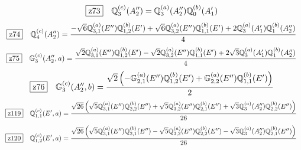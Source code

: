 \documentclass[fleqn,10pt,landscape]{jsarticle}
\begin{document}
\begin{dmath*}
\hspace*{3mm}\fbox{z73}\quad \mathbb{Q}_{3}^{(c)}(A_{2}^{\prime\prime})=\mathbb{Q}_{3}^{(a)}(A_{2}^{\prime\prime}) \mathbb{Q}_{0}^{(b)}(A_{1}^{\prime})
\end{dmath*}
\begin{dmath*}
\hspace*{3mm}\fbox{z74}\quad \mathbb{Q}_{4}^{(c)}(A_{2}^{\prime\prime})=\frac{- \sqrt{6} \mathbb{Q}_{3,1}^{(a)}(E^{\prime\prime}) \mathbb{Q}_{1,2}^{(b)}(E^{\prime}) + \sqrt{6} \mathbb{Q}_{3,2}^{(a)}(E^{\prime\prime}) \mathbb{Q}_{1,1}^{(b)}(E^{\prime}) + 2 \mathbb{Q}_{3}^{(a)}(A_{1}^{\prime}) \mathbb{Q}_{1}^{(b)}(A_{2}^{\prime\prime})}{4}
\end{dmath*}
\begin{dmath*}
\hspace*{3mm}\fbox{z75}\quad \mathbb{G}_{3}^{(c)}(A_{2}^{\prime\prime},a)=\frac{\sqrt{2} \mathbb{Q}_{3,1}^{(a)}(E^{\prime\prime}) \mathbb{Q}_{1,2}^{(b)}(E^{\prime}) - \sqrt{2} \mathbb{Q}_{3,2}^{(a)}(E^{\prime\prime}) \mathbb{Q}_{1,1}^{(b)}(E^{\prime}) + 2 \sqrt{3} \mathbb{Q}_{3}^{(a)}(A_{1}^{\prime}) \mathbb{Q}_{1}^{(b)}(A_{2}^{\prime\prime})}{4}
\end{dmath*}
\begin{dmath*}
\hspace*{3mm}\fbox{z76}\quad \mathbb{G}_{3}^{(c)}(A_{2}^{\prime\prime},b)=\frac{\sqrt{2} \left(- \mathbb{G}_{2,1}^{(a)}(E^{\prime\prime}) \mathbb{Q}_{1,2}^{(b)}(E^{\prime}) + \mathbb{G}_{2,2}^{(a)}(E^{\prime\prime}) \mathbb{Q}_{1,1}^{(b)}(E^{\prime})\right)}{2}
\end{dmath*}
\begin{dmath*}
\hspace*{3mm}\fbox{z119}\quad \mathbb{Q}_{1,1}^{(c)}(E^{\prime},a)=\frac{\sqrt{26} \left(\sqrt{5} \mathbb{Q}_{3,1}^{(a)}(E^{\prime\prime}) \mathbb{Q}_{2,2}^{(b)}(E^{\prime\prime}) + \sqrt{5} \mathbb{Q}_{3,2}^{(a)}(E^{\prime\prime}) \mathbb{Q}_{2,1}^{(b)}(E^{\prime\prime}) + \sqrt{3} \mathbb{Q}_{3}^{(a)}(A_{2}^{\prime\prime}) \mathbb{Q}_{2,2}^{(b)}(E^{\prime\prime})\right)}{26}
\end{dmath*}
\begin{dmath*}
\hspace*{3mm}\fbox{z120}\quad \mathbb{Q}_{1,2}^{(c)}(E^{\prime},a)=\frac{\sqrt{26} \left(\sqrt{5} \mathbb{Q}_{3,1}^{(a)}(E^{\prime\prime}) \mathbb{Q}_{2,1}^{(b)}(E^{\prime\prime}) - \sqrt{5} \mathbb{Q}_{3,2}^{(a)}(E^{\prime\prime}) \mathbb{Q}_{2,2}^{(b)}(E^{\prime\prime}) - \sqrt{3} \mathbb{Q}_{3}^{(a)}(A_{2}^{\prime\prime}) \mathbb{Q}_{2,1}^{(b)}(E^{\prime\prime})\right)}{26}
\end{dmath*}
\end{document}
